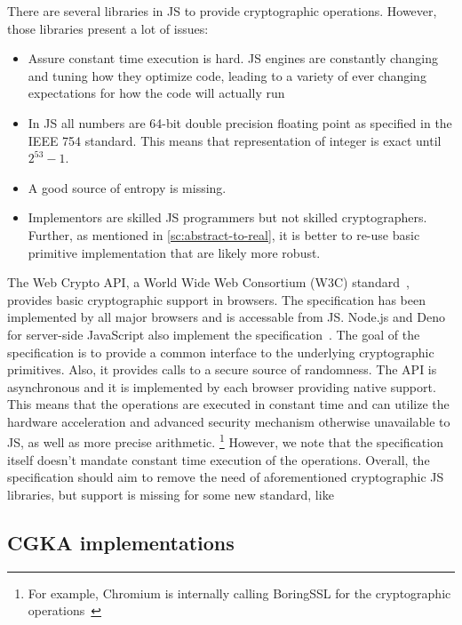 There are several libraries in JS to provide cryptographic
operations.
However, those libraries present a lot of issues:
\begin{itemize}
    \item Assure constant time execution is hard. JS engines are constantly changing and tuning how they optimize code, leading to a variety of ever changing expectations for how the code will actually run
    \item In JS all numbers are 64-bit double precision floating point as specified in the IEEE 754 standard. This means that representation of integer is exact until $2^{53} - 1$.
    \item A good source of entropy is missing.
    \item Implementors are skilled JS programmers but not skilled cryptographers. Further, as mentioned in \cref{sc:abstract-to-real}, it is better to re-use basic primitive implementation that are likely more robust. 
\end{itemize}

The Web Crypto API, a World Wide Web Consortium (W3C) standard~\cite{WebCryptoAPISpecification}, 
provides basic cryptographic support in browsers.
The specification has been implemented by all major browsers
and is accessable from JS. 
Node.js and Deno for server-side JavaScript also implement the specification~\cite{NodeJsWebCryptoAPI, DenoWebCryptoAPI}.
The goal of the specification
is to provide a common interface to the underlying 
cryptographic primitives. Also, it provides calls to
a secure source of randomness. 
The API is asynchronous and it is implemented by each
browser providing native support. This means that the
operations are executed in constant time and can
utilize the hardware acceleration and advanced
security mechanism otherwise unavailable to JS, as well as
more precise arithmetic.
\footnote{For example, Chromium is internally calling BoringSSL for the cryptographic operations~\cite{ChromiumWebCryptoAPIImplementation}}
However, we note that the specification itself doesn't mandate
constant time execution of the operations.
Overall, the specification should aim to 
remove the need of aforementioned cryptographic JS libraries,
but support is missing for some new standard, like 

\subsection{CGKA implementations}\label{sc:CGKA-implementations}
